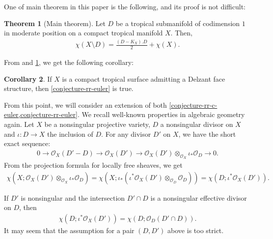 \documentclass[a4paper,dvipdfmx,reqno,12pt]{amsart}
\theoremstyle{definition}
\newtheorem{theorem}{Theorem}[section]
\newtheorem{corollary}[theorem]{Corollary}
\numberwithin{equation}{section}
\begin{document}
One of main theorem in this paper
is the following, and its proof is not difficult:
\begin{theorem}[{Main theorem}]
\label{theorem-rr-euler-surface}
Let $D$ be a tropical submanifold of codimension $1$
in moderate position on a compact tropical manifold
$X$. Then,
\begin{align}
\chi(X\setminus D)=\frac{(D-K_X). D}{2}+
\chi(X).
\end{align}
\end{theorem}
From \cite[Theorem 6.3]{demedrano2023chern}
and \cref{theorem-rr-euler-surface}, we get
the following corollary:
\begin{corollary}
\label{corollary-ds-euler-rr}
If $X$ is a compact tropical surface admitting 
a Delzant face structure, then
\cref{conjecture-rr-euler} is true.
\end{corollary}
From this point, 
we will consider an extension of both
\cref{conjecture-rr-c-euler,conjecture-rr-euler}.
We recall well-known properties in algebraic geometry again.
Let $X$ be a nonsingular projective variety,
$D$ a nonsingular divisor on $X$ and
$\iota\colon D\to X$ the inclusion of $D$.
For any divisor $D'$ on $X$, we have
the short exact sequence:
\begin{align}
0 \to \mathcal{O}_X(D'-D)\to \mathcal{O}_X(D')
\to \mathcal{O}_X(D')
\otimes_{\mathcal{O}_X} \iota_*\mathcal{O}_D \to 0. 
\end{align}
From the projection formula for locally free sheaves,
we get 
\begin{align}
\chi(X;\mathcal{O}_X(D')\otimes_{\mathcal{O}_X} \iota_*\mathcal{O}_D)
=\chi(X;\iota_*(\iota^{*}\mathcal{O}_X(D')\otimes_{\mathcal{O}_D} \mathcal{O}_D))
=\chi(D;\iota^{*}\mathcal{O}_X(D')).
\end{align}

If $D'$ is nonsingular and the intersection
$D'\cap D$ is a nonsingular effective divisor
on $D$, then
\begin{align}
\chi(D;\iota^{*}\mathcal{O}_X(D'))=\chi(D;\mathcal{O}_D(D'\cap D)).
\end{align}
It may seem that 
the assumption for a pair $(D,D')$ above is
too strict.
\end{document}
